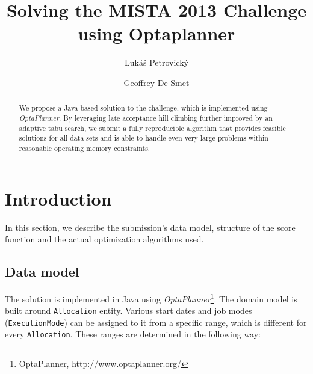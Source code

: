 \documentclass[draft]{svjour3}
\begin{document}
\title{Solving the MISTA 2013 Challenge using Optaplanner}

\author{
	Lukáš Petrovický \and
	Geoffrey De Smet
}


\maketitle

\begin{abstract}
We propose a Java-based solution to the challenge, which is implemented using \textit{OptaPlanner}. By leveraging late acceptance hill climbing further improved by an adaptive tabu search, we submit a fully reproducible algorithm that provides feasible solutions for all data sets and is able to handle even very large problems within reasonable operating memory constraints.
\end{abstract}

\section{Introduction}

In this section, we describe the submission's data model, structure of the score function and the actual optimization algorithms used.

\subsection{Data model}

The solution is implemented in Java using \textit{OptaPlanner}\footnote{OptaPlanner, http://www.optaplanner.org/}. The domain model is built around \texttt{Allocation} entity. Various start dates and job modes (\texttt{ExecutionMode}) can be assigned to it from a specific range, which is different for every \texttt{Allocation}. These ranges are determined in the following way:
\end{document}
